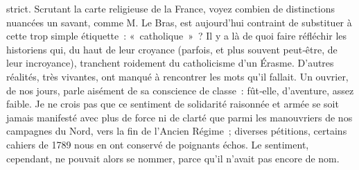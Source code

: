 \documentclass[french,twoside]{book} %
\newcommand{\astermono}{\medskip\centerline{\color{rubric}\large\selectfont{\syms ✻}}\medskip\par}%
\begin{document}
\label{p85} strict. Scrutant la carte religieuse de la France, voyez combien de dis­tinctions nuancées un savant, comme M. Le Bras, est aujourd’hui contraint de substituer à cette trop simple étiquette : « catholique » ? Il y a là de quoi faire réfléchir les historiens qui, du haut de leur croyance (parfois, et plus souvent peut‑être, de leur incroyance), tranchent roidement du catholicisme d’un Érasme. D’autres réalités, très vivantes, ont manqué à rencontrer les mots qu’il fallait. Un ouvrier, de nos jours, parle aisément de sa conscience de classe : fût‑elle, d’aventure, assez faible. Je ne crois pas que ce sentiment de solidarité raisonnée et armée se soit jamais mani­festé avec plus de force ni de clarté que parmi les manouvriers de nos campagnes du Nord, vers la fin de l’Ancien Régime ; diverses pétitions, certains cahiers de 1789 nous en ont conservé de poignants échos. Le sentiment, cependant, ne pouvait alors se nommer, parce qu’il n’avait pas encore de nom.\par

\astermono
\end{document}
